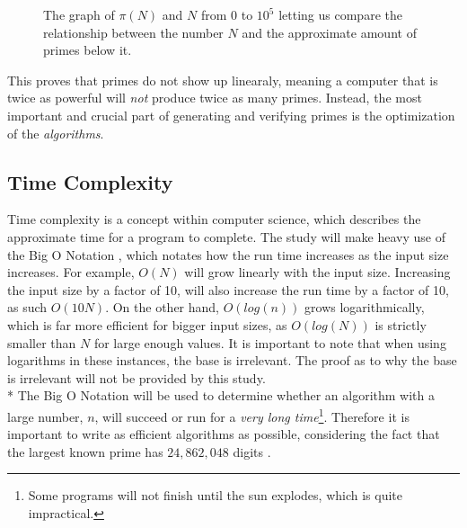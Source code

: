 \documentclass[main.tex]{subfiles}
\begin{document}
\begin{figure}[h]
    \begin{center}
    \end{center}
\caption{The graph of $\pi(N)$ and $N$ from $0$ to $10^{5}$ letting us compare the relationship between the number $N$ and the approximate amount of primes below it.}
\end{figure}

This proves that primes do not show up linearaly, meaning a computer that is twice as powerful will \textit{not} produce twice as many primes. Instead, the most important and crucial part of generating and verifying primes is the optimization of the \textit{algorithms}.

\subsection{Time Complexity}

Time complexity \cite{theorem:time_comp} is a concept within computer science, which describes the approximate time for a program to complete. The study will make heavy use of the Big O Notation \cite{theorem:big_O}, which notates how the run time increases as the input size increases. For example, $O(N)$ will grow linearly with the input size. Increasing the input size by a factor of 10, will also increase the run time by a factor of 10, as such $O(10N)$. On the other hand, $O(log(n))$ grows logarithmically, which is far more efficient for bigger input sizes, as $O(log(N))$ is strictly smaller than $N$ for large enough values. It is important to note that when using logarithms in these instances, the base is irrelevant. The proof as to why the base is irrelevant will not be provided by this study.
\newline
\\*
The Big O Notation will be used to determine whether an algorithm with a large number, $n$, will succeed or run for a \textit{very long time}\footnote{Some programs will not finish until the sun explodes, which is quite impractical.}. Therefore it is important to write as efficient algorithms as possible, considering the fact that the largest known prime has $24,862,048$ digits \cite{prime:largest_digits}. 
\end{document}
